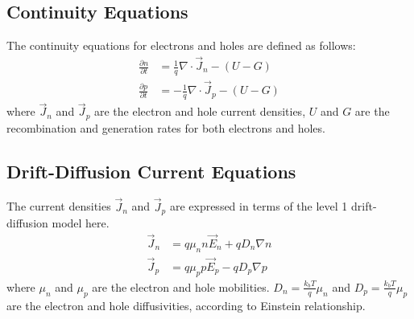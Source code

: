 \documentclass[oneside,12pt]{cgd_book}
\begin{document}
\subsection{Continuity Equations}\label{Continuity equation+DDML1}The continuity equations for electrons and holes are defined as follows:
\begin{subequations}
\begin{align}
 \frac{\partial n}{\partial t}  &= \frac{1}{q}\nabla \cdot \vec{J}_n - (U - G)\\
 \frac{\partial p}{\partial t}  &= - \frac{1}{q}\nabla \cdot \vec{J}_p - (U - G)
\end{align}
\end{subequations}
where $\vec{J}_n$ and $\vec{J}_p$ are the electron
      and hole current densities, $U$ and $G$ are the
      recombination and generation rates for both electrons and holes.
\par
\subsection{Drift-Diffusion Current Equations}\label{Drift-diffusion current+DDML1}The current densities
$\vec{J}_n$ and $\vec{J}_p$ are expressed in terms of the level 1 drift-diffusion model here.
\begin{subequations}
\begin{align}
 \vec{J}_n  &= q\mu_n n \vec{E}_n + q D_n \nabla n\\
 \vec{J}_p & = q\mu_p p \vec{E}_p - q D_p \nabla p
\end{align}
\end{subequations}
where $\mu_n$ and $\mu_p$ are the
      electron and hole mobilities. $D_n=\frac{k_bT}{q}\mu_n$ and
$D_p=\frac{k_bT}{q}\mu_p$ are the electron and hole diffusivities, according to Einstein
      relationship.
\par
\end{document}
